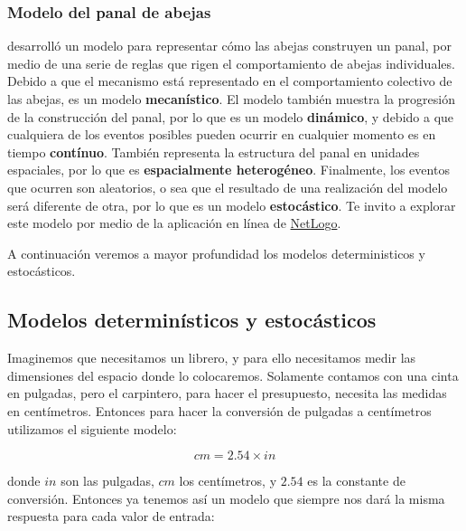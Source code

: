 \documentclass[
]{book}
\begin{document}
\hypertarget{modelo-del-panal-de-abejas}{%
\subsubsection{Modelo del panal de abejas}\label{modelo-del-panal-de-abejas}}

\citet{wilenski2003honey} desarrolló un modelo para representar cómo las abejas construyen un panal, por medio de una serie de reglas que rigen el comportamiento de abejas individuales. Debido a que el mecanismo está representado en el comportamiento colectivo de las abejas, es un modelo \textbf{mecanístico}. El modelo también muestra la progresión de la construcción del panal, por lo que es un modelo \textbf{dinámico}, y debido a que cualquiera de los eventos posibles pueden ocurrir en cualquier momento es en tiempo \textbf{contínuo}. También representa la estructura del panal en unidades espaciales, por lo que es \textbf{espacialmente heterogéneo}. Finalmente, los eventos que ocurren son aleatorios, o sea que el resultado de una realización del modelo será diferente de otra, por lo que es un modelo \textbf{estocástico}. Te invito a explorar este modelo por medio de la aplicación en línea de \href{https://www.netlogoweb.org/launch\#https://www.netlogoweb.org/assets/modelslib/Sample\%20Models/Biology/Honeycomb.nlogo}{NetLogo}.

A continuación veremos a mayor profundidad los modelos deterministicos y estocásticos.

\hypertarget{modelos-determinuxedsticos-y-estocuxe1sticos}{%
\subsection{Modelos determinísticos y estocásticos}\label{modelos-determinuxedsticos-y-estocuxe1sticos}}

Imaginemos que necesitamos un librero, y para ello necesitamos medir las dimensiones del espacio donde lo colocaremos. Solamente contamos con una cinta en pulgadas, pero el carpintero, para hacer el presupuesto, necesita las medidas en centímetros. Entonces para hacer la conversión de pulgadas a centímetros utilizamos el siguiente modelo:

\begin{equation}
    cm = 2.54 \times in  \label{eq:pulgadas}
\end{equation}

donde \(in\) son las pulgadas, \(cm\) los centímetros, y \(2.54\) es la constante de conversión. Entonces ya tenemos así un modelo que siempre nos dará la misma respuesta para cada valor de entrada:
\end{document}
